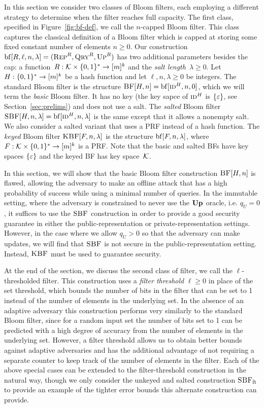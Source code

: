 In this section we consider two classes of Bloom filters, each employing a
different strategy to determine when the filter reaches full capacity. The first
class, specified in Figure~\ref{fig:bf-def}, we call the $n$-capped Bloom
filter. This class captures the classical definition of a Bloom filter which is
capped at storing some fixed constant number of elements $n\geq0$. Our
construction $\mathrm{bf}[R,\ell,n,\lambda] = (\textnormal{\textsc{Rep}}^R,\textnormal{\textsc{Qry}}^R,\textnormal{\textsc{Up}}^R)$ has two
additional parameters besides the cap: a function~$R:\mathcal{K}\times\{0,1\}^*\to[m]^k$
and the \emph{salt length}~$\lambda\geq0$.
%
Let $H:\{0,1\}^*\to[m]^k$ be a hash function and let $\ell, n, \lambda\geq0$ be
integers.
%
The standard Bloom filter is the structure $\textnormal{\textsc{BF}}[H,n] =
\mathrm{bf}[\textnormal{\textsc{id}}^H,n,0]$, which we will term the \emph{basic} Bloom filter. It
has no key (the key sapce of $\textnormal{\textsc{id}}^H$ is $\{\varepsilon\}$, see
Section~\ref{sec:prelims}) and does not use a salt.
%
The \emph{salted} Bloom filter $\textnormal{\textsc{SBF}}[H,n,\lambda] =
\mathrm{bf}[\textnormal{\textsc{id}}^H,n,\lambda]$ is the same except that it allows a nonempty salt.
%
We also consider a salted variant that uses a PRF instead of a hash
function. The \emph{keyed} Bloom filter $\textnormal{\textsc{KBF}}[F,n,\lambda]$ is the
structure $\mathrm{bf}[F,n,\lambda]$, where $F:\mathcal{K}\times\{0,1\}^*\to[m]^k$ is a
PRF.
%
Note that the basic and salted BFs have key spaces $\{\varepsilon\}$ and the keyed
BF has key space~$\mathcal{K}$.

In this section, we will show that the basic Bloom filter construction
$\textnormal{\textsc{BF}}[H,n]$ is flawed, allowing the adversary to make an offline attack that
has a high probability of success while using a minimal number of queries. In
the immutable setting, where the adversary is constrained to never use the
$\textup{\textbf{Up}}\hspace{0.5pt}$ oracle, i.e. $q_U = 0$, it suffices to use the $\textnormal{\textsc{SBF}}$ construction in
order to provide a good security guarantee in either the public-representation
or private-representation settings. However, in the case where we allow
$q_U > 0$ so that the adversary can make updates, we will find that $\textnormal{\textsc{SBF}}$ is
not secure in the public-representation setting. Instead, $\textnormal{\textsc{KBF}}$ must be used to
guarantee security.

At the end of the section, we discuss the second class of filter, we call the
$\ell$-thresholded filter. This construction uses a \emph{filter threshold}
$\ell\geq0$ in place of the set threshold, which bounds the number of bits in
the filter that can be set to 1 instead of the number of elements in the
underlying set. In the absence of an adaptive adversary this construction
performs very similarly to the standard Bloom filter, since for a random input
set the number of bits set to 1 can be predicted with a high degree of accuracy
from the number of elements in the underlying set. However, a filter threshold
allows us to obtain better bounds against adaptive adversaries and has the
additional advantage of not requiring a separate counter to keep track of the
number of elements in the filter. Each of the above special cases can be
extended to the filter-threshold construction in the natural way, though we only
consider the unkeyed and salted construction $\textnormal{\textsc{SBF}}_\mathrm{ft}$ to provide an example
of the tighter error bounds this alternate construction can provide.


